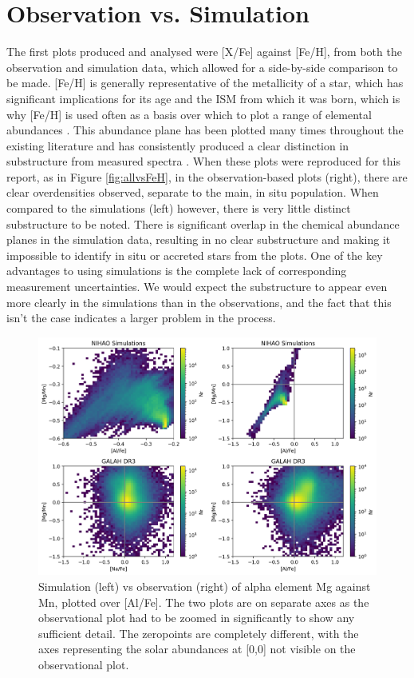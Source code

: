 \documentclass[fleqn,usenatbib]{mnras}
\begin{document}
\section{Observation vs. Simulation}
\label{sec:obs_vs_sim}
The first plots produced and analysed were [X/Fe] against [Fe/H], from both the observation and simulation data, which allowed for a side-by-side comparison to be made. [Fe/H] is generally representative of the metallicity of a star, which has significant implications for its age and the ISM from which it was born, which is why [Fe/H] is used often as a basis over which to plot a range of elemental abundances \citep{Buder2022}.  
This abundance plane has been plotted many times throughout the existing literature and has consistently produced a clear distinction in substructure from measured spectra \citep{Das2020, Nissen2010}. When these plots were reproduced for this report, as in Figure \ref{fig:allvsFeH}, in the observation-based plots (right), there are clear overdensities observed, separate to the main, in situ population. When compared to the simulations (left) however, there is very little distinct substructure to be noted. There is significant overlap in the chemical abundance planes in the simulation data, resulting in no clear substructure and making it impossible to identify in situ or accreted stars from the plots.  
One of the key advantages to using simulations is the complete lack of corresponding measurement uncertainties. We would expect the substructure to appear even more clearly in the simulations than in the observations, and the fact that this isn't the case indicates a larger problem in the process. 
\begin{figure}
	\includegraphics[width=\textwidth]{[MgMn] vs [AlFe].png}
    \caption{Simulation (left) vs observation (right) of alpha element Mg against Mn, plotted over [Al/Fe]. The two plots are on separate axes as the observational plot had to be zoomed in significantly to show any sufficient detail. The zeropoints are completely different, with the axes representing the solar abundances at [0,0] not visible on the observational plot.}
    \label{fig:alpha}
\end{figure}
\end{document}
